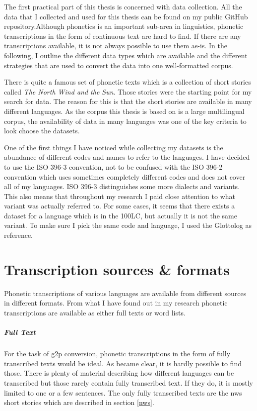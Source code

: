 \label{chap:data_collection}
The first practical part of this thesis is concerned with data collection. All the data that I collected and used for this thesis can be found on my public GitHub repository.Although phonetics is an important sub-area in linguistics, phonetic transcriptions in the form of continuous text are hard to find. If there are any transcriptions available, it is not always possible to use them as-is. In the following, I outline the different data types which are available and the different strategies that are used to convert the data into one well-formatted corpus. 

There is quite a famous set of phonetic texts which is a collection of short stories called \textit{The North Wind and the Sun}. Those stories were the starting point for my search for data. The reason for this is that the short stories are available in many different languages. As the corpus  this thesis is based on is a large multilingual corpus, the availability of data in many languages was one of the key criteria to look choose the datasets.

One of the first things I have noticed while collecting my datasets is the abundance of different codes and names to refer to the languages. I have decided to use the ISO 396-3 convention, not to be confused with the ISO 396-2 convention which uses sometimes completely different codes and does not cover all of my languages. ISO 396-3 distinguishes some more dialects and variants. This also means that throughout my research I paid close attention to what variant was actually referred to. For some cases, it seems that there exists a dataset for a language which is in the 100LC, but actually it is not the same variant. To make sure I pick the same code and language, I used the Glottolog as reference.


\section{Transcription sources \& formats}
Phonetic transcriptions of various languages are available from different sources in different formats. From what I have found out in my research phonetic transcriptions are available as either full texts or word lists.

\subparagraph{Full Text}
For the task of \ac{g2p} conversion, phonetic transcriptions in the form of fully transcribed texts would be ideal. As became clear, it is hardly possible to find those. There is plenty of material describing how different languages can be transcribed but those rarely contain fully transcribed text. If they do, it is mostly limited to one or a few sentences. The only fully transcribed texts are the \ac{nws} short stories which are described in section \ref{nws}.

